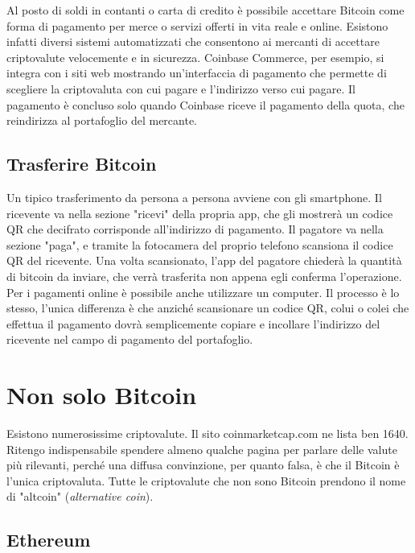 \documentclass {article}
\begin{document}
Al posto di soldi in contanti o carta di credito è possibile accettare Bitcoin come forma di pagamento per merce o servizi offerti in vita reale e online.
Esistono infatti diversi sistemi automatizzati che consentono ai mercanti di accettare criptovalute velocemente e in sicurezza.
Coinbase Commerce, per esempio, si integra con i siti web mostrando un'interfaccia di pagamento che permette di scegliere la criptovaluta con cui pagare e l'indirizzo verso cui pagare. Il pagamento è concluso solo quando Coinbase riceve il pagamento della quota, che reindirizza al portafoglio del mercante.


\subsection {Trasferire Bitcoin}


Un tipico trasferimento da persona a persona avviene con gli smartphone.
Il ricevente va nella sezione "ricevi" della propria app, che gli mostrerà un codice QR che decifrato corrisponde all'indirizzo di pagamento.
Il pagatore va nella sezione "paga", e tramite la fotocamera del proprio telefono scansiona il codice QR del ricevente.
Una volta scansionato, l'app del pagatore chiederà la quantità di bitcoin da inviare, che verrà trasferita non appena egli conferma l'operazione.
Per i pagamenti online è possibile anche utilizzare un computer. Il processo è lo stesso, l'unica differenza è che anziché scansionare un codice QR, colui o colei che effettua il pagamento dovrà semplicemente copiare e incollare l'indirizzo del ricevente nel campo di pagamento del portafoglio.


\newpage


\section {Non solo Bitcoin}


Esistono numerosissime criptovalute. Il sito coinmarketcap.com ne lista ben 1640. Ritengo indispensabile spendere almeno qualche pagina per parlare delle valute più rilevanti, perché una diffusa convinzione, per quanto falsa, è che il Bitcoin è l'unica criptovaluta. Tutte le criptovalute che non sono Bitcoin prendono il nome di "altcoin" (\textit{alternative coin}).


\subsection {Ethereum}
\end{document}
